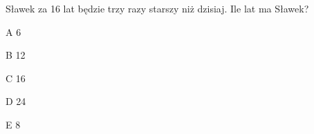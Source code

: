 \begin{tresc}
Sławek za 16 lat będzie trzy razy starszy niż dzisiaj. Ile lat ma Sławek?
\end{tresc}
\begin{wariant}{A} 6 \end{wariant}
\begin{wariant}{B} 12 \end{wariant}
\begin{wariant}{C} 16 \end{wariant}
\begin{wariant}{D} 24 \end{wariant}
\begin{wariant}{E} 8 \end{wariant}
